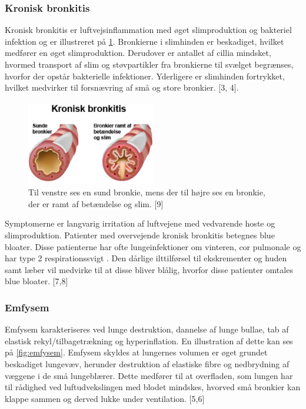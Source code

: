 \subsubsection{Kronisk bronkitis} 
Kronisk bronkitis er luftvejsinflammation med øget slimproduktion og bakteriel infektion og er illustreret på \ref{fig:kroniskbronkitis}. Bronkierne i slimhinden er beskadiget, hvilket medfører en øget slimproduktion. Derudover er antallet af cillia  mindsket, hvormed transport af slim og støvpartikler fra bronkierne til svælget begrænses, hvorfor der opstår bakterielle infektioner. Yderligere er slimhinden fortrykket, hvilket medvirker til forsnævring af små og store bronkier. [3, 4]. 

\begin{figure} [H]
\centering
\includegraphics[width=0.5\textwidth]{figures/kroniskbronkitis}
\caption{Til venstre ses en sund bronkie, mens der til højre ses en bronkie, der er ramt af betændelse og slim.  [9]}
\label{fig:kroniskbronkitis}
\end{figure} 

\noindent
Symptomerne er langvarig irritation af luftvejene med vedvarende hoste og slimproduktion. Patienter med overvejende kronisk bronkitis betegnes blue bloater. Disse patienterne har ofte lungeinfektioner om vinteren, cor pulmonale  og har type 2 respirationssvigt . Den dårlige ilttilførsel til ekskrementer og huden samt læber vil medvirke til at disse bliver blålig, hvorfor disse patienter omtales blue bloater. [7,8] 

\subsubsection{Emfysem}
Emfysem karakteriseres ved lunge destruktion, dannelse af lunge bullae, tab af elastisk rekyl/tilbagetrækning og hyperinflation. En illustration af dette kan ses på \ref{fig:emfysem}. Emfysem skyldes at lungernes volumen er øget grundet beskadiget lungevæv, herunder destruktion af elastiske fibre og nedbrydning af væggene i de små lungeblærer. Dette medfører til at overfladen, som lungen har til rådighed ved luftudvekslingen med blodet mindskes, hvorved små bronkier kan klappe sammen og derved lukke under ventilation. [5,6]

